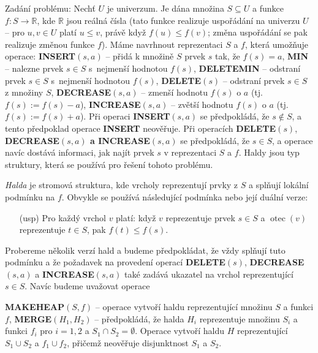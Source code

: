 \documentclass[a4paper,12pt]{article}
\DeclareMathOperator*{\otec}{otec}
\begin{document}
Zadání problému: Nechť $U$ je univerzum. Je dána množina 
$S\subseteq U$ a funkce $f:S\to\mathbb R$, kde $\mathbb R$ jsou reálná čísla (tato 
funkce realizuje uspořádání na univerzu $U$ -- pro $u,
v\in U$ platí 
$u\le v$, právě když $f(u)\le f(v)$; změna uspořádání se pak realizuje 
změnou funkce $f$).
Máme navrhnout reprezentaci $S$ a $f$, která umožňuje 
operace:\newline 
{\bf INSERT$(s,a)$} -- přidá k množině $S$ prvek $s$ tak, že 
$f(s)=a$,\newline 
{\bf MIN} -- nalezne prvek $s\in S$ s~nejmenší hodnotou 
$f(s)$,\newline 
{\bf DELETEMIN} -- odstraní prvek $s\in S$ s~nejmenší hodnotou 
$f(s)$,\newline 
{\bf DELETE$(s)$} -- odstraní prvek $s\in S$ z množiny $S$,\newline 
{\bf DECREASE$(s,a)$} -- zmenší hodnotu $f(s)$ o $a$ (tj. 
$f(s):=f(s)-a$),\newline 
{\bf INCREASE$(s,a)$} -- zvětší hodnotu $f(s)$ o $a$ (tj. 
$f(s):=f(s)+a$).\newline 
Při operaci {\bf INSERT$(s,a)$} se předpokládá, že $
s\notin S$, a tento 
předpoklad operace {\bf INSERT} neověřuje. Při operacích {\bf DE\-LE\-TE$
(s)$},
{\bf DECREASE$(s,a)$ a INCREASE$(s,a)$} se před\-pokládá, že $
s\in S$, 
a operace navíc dostává informaci, jak najít  
prvek $s$ v reprezentaci $S$ a $f$. Haldy jsou typ 
struktury, která se používá pro řešení tohoto problému. 

\emph{Halda} je stromová struktura, kde vrcholy 
reprezentují prvky z $S$ a splňují lokální podmínku na 
$f$. Obvykle se používá následující podmínka nebo její 
duální verze:

\begin{enumerate}
\item[(usp)]
Pro každý vrchol $v$ platí: když $v$ reprezentuje prvek 
$s\in S$ a $\otec(v)$ reprezentuje $t\in S$, pak $f(t)\le f(s)$.
\end{enumerate}

Probereme několik verzí hald a budeme 
předpokládat, že vždy splňují tuto podmínku a že požadavek na 
provedení operací {\bf DELETE$(s)$}, {\bf DECREA\-SE$(s,a
)$} a {\bf INCREASE$(s,a)$ }
také zadává ukazatel na vrchol repre\-zentující $s\in 
S$.  Navíc budeme 
uvažovat operace

{\bf MAKEHEAP$(S,f)$} -- operace vytvoří haldu 
reprezentující množinu $S$ a funkci $f$,\newline 
{\bf MERGE$(H_1,H_2)$} -- předpokládá, že halda $H_i$ reprezentuje 
množinu $S_i$ a funkci $f_i$ pro $i=1,2$ a $S_1\cap S_2=\emptyset$. Operace 
vytvoří haldu $H$ reprezentující $S_1\cup S_2$ a $
f_1\cup f_2$, 
přičemž neověřuje disjunktnost $S_1$ a $S_2$.
\end{document}
